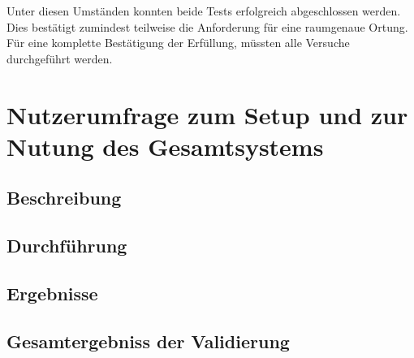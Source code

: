 Unter diesen Umständen konnten beide Tests erfolgreich abgeschlossen werden.
Dies bestätigt zumindest teilweise die Anforderung für eine raumgenaue Ortung.
Für eine komplette Bestätigung der Erfüllung, müssten alle Versuche durchgeführt werden.

\section{Nutzerumfrage zum Setup und zur Nutung des Gesamtsystems}

\subsection{Beschreibung}

\subsection{Durchführung}

\subsection{Ergebnisse}


\subsection{Gesamtergebniss der Validierung}